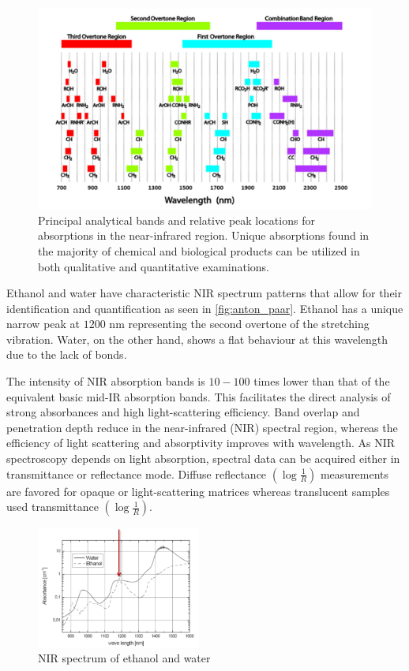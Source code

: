 \documentclass[12pt]{report}
\renewcommand{\cite}{\supercite}
\begin{document}
\begin{figure}[h]
    \centering
    \includegraphics[width=0.75\linewidth]{Images/principle_bands.png}
    \caption{Principal analytical bands and relative peak locations for absorptions in the near-infrared region.\cite{UseInfraredSpectroscopyjohnson2023} Unique absorptions found in the majority of chemical and biological products can be utilized in both qualitative and quantitative examinations.}
    \label{fig:principle_bands}
\end{figure}

Ethanol and water have characteristic NIR spectrum patterns that allow for their identification and quantification as seen in \autoref{fig:anton_paar}. Ethanol has a unique narrow peak at $1200$ nm representing the second overtone of the  stretching vibration.\cite{InfraredSpectroscopyNIR} Water, on the other hand, shows a flat behaviour at this wavelength due to the lack of  bonds. 

The intensity of NIR absorption bands is $10-100$ times lower than that of the equivalent basic mid-IR absorption bands.\cite{PracticalGuideInterpretiveworkman2007} This facilitates the direct analysis of strong absorbances and high light-scattering efficiency. Band overlap and penetration depth reduce in the near-infrared (NIR) spectral region, whereas the efficiency of light scattering and absorptivity improves with wavelength. As NIR spectroscopy depends on light absorption, spectral data can be acquired either in transmittance or reflectance mode. Diffuse reflectance $(\log \frac{1}{R} )$ measurements are favored for opaque or light-scattering matrices whereas translucent samples used transmittance $(\log \frac{1}{R})$.

\begin{figure}
    \centering
    \includegraphics[width=0.48\textwidth]{Images/anton_paar.png}
    \caption{NIR spectrum of ethanol and water \cite{InfraredSpectroscopyNIR}}
    \label{fig:anton_paar}
\end{figure}
\end{document}
